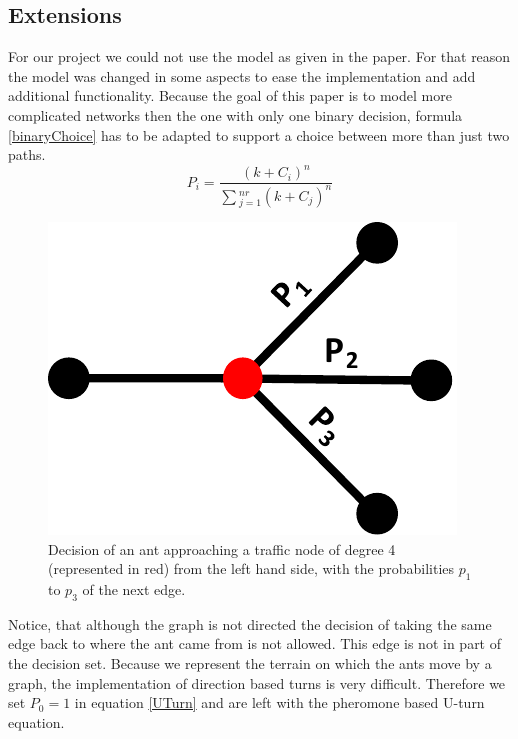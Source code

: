 \subsection{Extensions}
 For our project we could not use the model as given in the paper. For that reason the model was changed in some aspects to ease the implementation and add additional functionality. Because the goal of this paper is to model more complicated networks then the one with only one binary decision, formula \ref{binaryChoice} has to be adapted to support a choice between more than just two paths. 
\begin{equation} \label{multiDecisions}
P_i = \frac{(k+C_i)^n}{\sum{_{j=1}^{nr}(k+C_j)^n}}
\end{equation}  
\begin{figure}[H]
	\centering
	\includegraphics[scale=0.5]{decision3.pdf}
	\caption{Decision of an ant approaching a traffic node of degree 4 (represented in red) from the left hand side, with the probabilities $p_1$ to $p_3$ of the next edge.}
\end{figure}
Notice, that although the graph is not directed the decision of taking the same edge back to where the ant came from is not allowed. This edge is not in part of the decision set.
Because we represent the terrain on which the ants move by a graph, the implementation of direction based turns is very difficult. Therefore we set $P_0 = 1$ in equation \ref{UTurn} and are left with the pheromone based U-turn equation.
